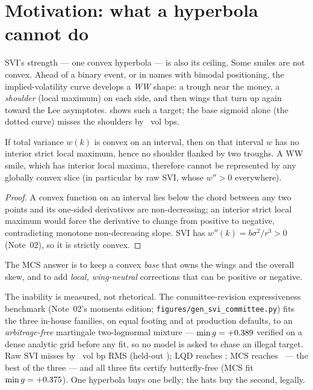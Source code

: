 \documentclass[11pt]{article}
\begin{document}
\section{Motivation: what a hyperbola cannot do}
\label{sec:motivation}

SVI's strength --- one convex hyperbola --- is also its ceiling. Some smiles are
not convex. Ahead of a binary event, or in names with bimodal positioning, the
implied-volatility curve develops a \emph{WW} shape: a trough near the money,
a \emph{shoulder} (local maximum) on each side, and then wings that turn up again
toward the Lee asymptotes.  shows such a target; the base sigmoid
alone (the dotted curve) misses the shoulders by \sivbasemaxerr\ vol bps.

\begin{proposition}
\label{prop:convex}
If total variance $w(k)$ is convex on an interval, then on that interval $w$ has
no interior strict local maximum, hence no shoulder flanked by two troughs. A
WW smile, which has interior local maxima, therefore cannot be represented by any
globally convex slice (in particular by raw SVI, whose $w''>0$ everywhere).
\end{proposition}

\begin{proof}
A convex function on an interval lies below the chord between any two points and
its one-sided derivatives are non-decreasing; an interior strict local maximum
would force the derivative to change from positive to negative, contradicting
monotone non-decreasing slope. SVI has $w''(k)=b\sigma^2/r^3>0$ (Note~02), so it
is strictly convex.
\end{proof}

The MCS answer is to keep a convex \emph{base} that owns the wings and the
overall skew, and to add \emph{local, wing-neutral} corrections that can be
positive or negative.

The inability is measured, not rhetorical. The committee-revision
expressiveness benchmark (Note~02's moments edition;
\nolinkurl{figures/gen_svi_committee.py}) fits the three in-house families,
on equal footing and at production defaults, to an \emph{arbitrage-free}
martingale two-lognormal mixture --- $\min g=+0.389$ verified on a
dense analytic grid before any fit, so no model is asked to chase an illegal
target. Raw SVI misses by \svimommixsvirms\ vol bp RMS (held-out
\svimommixsviho); LQD reaches \svimommixlqdrms; MCS reaches
\svimommixmcsrms\ --- the best of the three --- and all three fits certify
butterfly-free (MCS fit $\min g=+0.375$). One hyperbola buys one
belly; the hats buy the second, legally.
\end{document}

